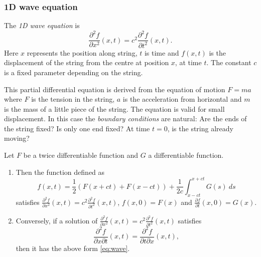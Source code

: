 \subsubsection*{1D wave equation}

The \emph{1D wave equation} is
\[
    \frac{\partial^2 f}{\partial x^2}(x,t) = c^2  \frac{\partial^2 f}{\partial t^2}(x,t).
\]
Here \(x\) represents the position along string,
\(t\) is time and \(f(x,t)\) is the displacement of the string from the centre at position \(x\), at time \(t\).
The constant \(c\) is a fixed parameter depending on the string.

This partial differential equation is derived from the equation of motion \(F = m a\) where \(F\) is the tension in the string, \(a\) is the acceleration from horizontal and \(m\) is the mass of a little piece of the string.
The equation is valid for small displacement.
In this case the \emph{boundary conditions} are natural: Are the ends of the string fixed? Is only one end fixed? At time \(t=0\), is the string already moving?

\begin{theorem}
    Let \(F\) be a twice differentiable function and \(G\) a differentiable function.
    \begin{enumerate}
        \item
              Then the function defined as
              \begin{equation}
                  \label{eq:wave}
                  f(x,t) = \frac{1}{2}(F(x+ct) + F(x-ct)) + \frac{1}{2c} \int_{x-ct}^{x+ct} G(s) \ ds
              \end{equation}
              satisfies \(   \frac{\partial^2 f}{\partial x^2}(x,t) = c^2  \frac{\partial^2 f}{\partial t^2}(x,t) \),
              \(f(x,0) = F(x)\)
              and \(\frac{\partial f}{\partial t}(x,0) = G(x)\).
        \item
              Conversely, if a solution of  \(   \frac{\partial^2 f}{\partial x^2}(x,t) = c^2  \frac{\partial^2 f}{\partial t^2}(x,t) \) satisfies
              \[\frac{\partial^2 f}{\partial x \partial t}(x,t) = \frac{\partial^2 f}{\partial t \partial x}(x,t),\]
              then it has the above form \eqref{eq:wave}.
    \end{enumerate}

\end{theorem}


